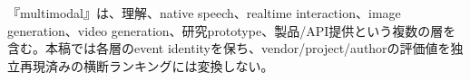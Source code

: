 \begin{claimboundary}
『multimodal』は、理解、native speech、realtime interaction、image generation、video generation、研究prototype、製品/API提供という複数の層を含む。本稿では各層のevent identityを保ち、vendor/project/authorの評価値を独立再現済みの横断ランキングには変換しない。\autocite{src-c5ed64e39d0c}
\end{claimboundary}
